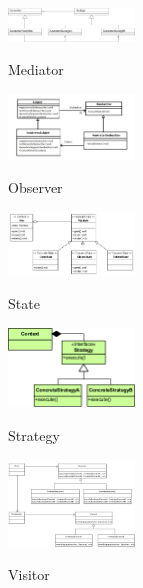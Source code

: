 \begin{figure}[h]
	\begin{center}
		\includegraphics[width=0.3\textwidth]{images/mediator}
		\label{fig:mediator}
		\caption{Mediator}
	\end{center}
\end{figure}

\begin{figure}[h]
	\begin{center}
		\includegraphics[width=0.3\textwidth]{images/observer}
		\label{fig:observer}
		\caption{Observer}
	\end{center}
\end{figure}

\begin{figure}[h]
	\begin{center}
		\includegraphics[width=0.3\textwidth]{images/state}
		\label{fig:state}
		\caption{State}
	\end{center}
\end{figure}

\begin{figure}[h]
	\begin{center}
		\includegraphics[width=0.3\textwidth]{images/strategy}
		\label{fig:strategy}
		\caption{Strategy}
	\end{center}
\end{figure}

\begin{figure}[h]
	\begin{center}
		\includegraphics[width=0.3\textwidth]{images/visitor}
		\label{fig:visitor}
		\caption{Visitor}
	\end{center}
\end{figure}
